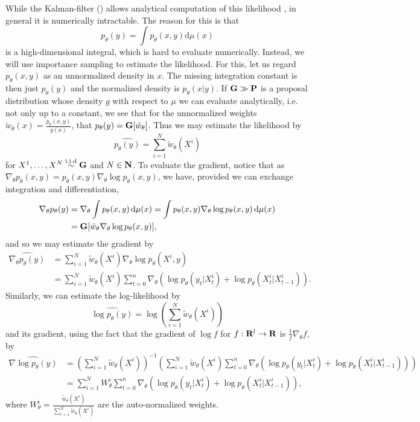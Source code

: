 While the Kalman-filter () allows analytical computation of this likelihood , in general  it is numerically intractable. The reason for this is that
$$
    p_{\theta}(y) = \int p_{\theta}(x,y) \mathrm d \mu(x)
$$
is a high-dimensional integral, which is hard to evaluate numerically. Instead, we will use importance sampling to estimate the likelihood. For this, let us regard $p_{\theta}(x,y)$ as an unnormalized density in $x$. The missing integration constant is then just $p_{\theta}(y)$ and the normalized density is $p_{\theta}(x|y)$. If $\mathbf G \gg \mathbf P$ is a proposal distribution whose density $g$ with respect to $\mu$ we can evaluate analytically, i.e. not only up to a constant, we see that for the unnormalized weights $\tilde w_{\theta}(x) = \frac{p_{\theta}(x,y)}{g(x)}$, that $p_{\theta}(y) = \mathbf G [\tilde w_{\theta}]$. Thus we may estimate the likelihood by 
$$
    \widehat{p_{\theta}(y)} = \sum_{i = 1}^N \tilde w_{\theta} (X^{i})
$$
for $X^{1}, \dots, X^{N} \stackrel{\text{i.i.d}}{\sim} \mathbf G$ and $N \in \mathbf N$. To evaluate the gradient, notice that as $\nabla_{\theta} p_{\theta}(x,y) = p_{\theta}(x,y) \nabla_{\theta} \log p_{\theta}(x,y)$, we have, provided we can exchange integration and differentiation,
\begin{align*}
     \nabla_{\theta} p_{\theta}(y) &= \nabla_{\theta}\int p_{\theta}(x,y)\,\mathrm d \mu(x) = \int p_{\theta}(x,y) \nabla_{\theta} \log p_{\theta}(x,y)\,\mathrm d \mu(x) \\
     &= \mathbf G [\tilde w_{\theta} \nabla_{\theta} \log p_{\theta}(x,y)],
\end{align*}
and so we may estimate the gradient by 
\begin{align*}
    \widehat{\nabla_{\theta} p_{\theta}(y)} &=\sum_{i = 1}^N \tilde w_{\theta}(X^{i}) \nabla_{\theta} \log p_{\theta}(X^{i}, y) \\
    &= \sum_{i = 1}^N \tilde w_{\theta}(X^{i}) \sum_{t = 0}^n \nabla_{\theta} \left( \log p_{\theta}(y_{t} | X^{i}_{t}) + \log p_{\theta}(X^{i}_t|X^{i}_{t - 1}) \right).
\end{align*}
Similarly, we can estimate the log-likelihood by
$$
    \widehat{\log p_{\theta}(y)} = \log \left( \sum_{i = 1}^N \tilde w_{\theta}(X^{i}) \right)
$$
and its gradient, using the fact that the gradient of $\log f$ for $f: \mathbf R^{l} \to \mathbf R$ is $ \frac{1}{f} \nabla_{\theta} f$, by 
\begin{align*}
    \widehat{\nabla \log p_{\theta}(y)} &= \left( \sum_{i = 1}^N \tilde w_{\theta}(X^{i}) \right)^{-1} \left( \sum_{i = 1}^N \tilde w_{\theta}(X^{i}) \sum_{t = 0}^n \nabla_{\theta} \left( \log p_{\theta}(y_{t} | X^{i}_{t}) + \log p_{\theta}(X^{i}_t|X^{i}_{t - 1}) \right) \right) \\
    &=\sum_{i = 1}^N W_{\theta}^{i} \sum_{t = 0}^n \nabla_{\theta} \left( \log p_{\theta}(y_{t} | X^{i}_{t}) + \log p_{\theta}(X^{i}_t|X^{i}_{t - 1}) \right),
\end{align*}
where $W_{\theta}^{i} = \frac{\tilde w_{\theta}(X^{i})}{\sum_{i= 1}^N \tilde w_{\theta}(X^{i})}$ are the auto-normalized weights.



